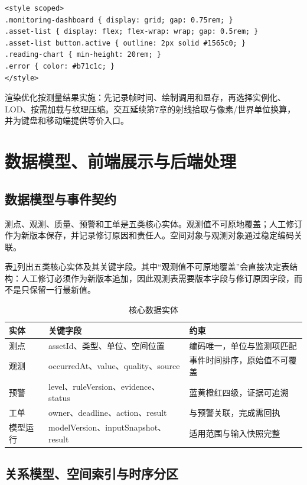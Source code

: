 \begin{lstlisting}[label={lst:ch08-monitoring-sfc},language=Vue,caption={测点筛选、ECharts 曲线与三维定位联动组件}]
<style scoped>
.monitoring-dashboard { display: grid; gap: 0.75rem; }
.asset-list { display: flex; flex-wrap: wrap; gap: 0.5rem; }
.asset-list button.active { outline: 2px solid #1565c0; }
.reading-chart { min-height: 20rem; }
.error { color: #b71c1c; }
</style>
\end{lstlisting}

渲染优化按测量结果实施：先记录帧时间、绘制调用和显存，再选择实例化、LOD、按需加载与纹理压缩。交互延续第7章的射线拾取与像素/世界单位换算，并为键盘和移动端提供等价入口。

\section{数据模型、前端展示与后端处理}

\subsection{数据模型与事件契约}

测点、观测、质量、预警和工单是五类核心实体。观测值不可原地覆盖；人工修订作为新版本保存，并记录修订原因和责任人。空间对象与观测对象通过稳定编码关联。

表\ref{tab:case-core-data}列出五类核心实体及其关键字段。其中“观测值不可原地覆盖”会直接决定表结构：人工修订必须作为新版本追加，因此观测表需要版本字段与修订原因字段，而不是只保留一行最新值。

\begin{table}[htbp]
\centering
\caption{核心数据实体}
\label{tab:case-core-data}
\begin{tabular}{p{2.4cm}p{4.5cm}p{5.5cm}}
\toprule
实体 & 关键字段 & 约束 \\
\midrule
测点 & assetId、类型、单位、空间位置 & 编码唯一，单位与监测项匹配 \\
观测 & occurredAt、value、quality、source & 事件时间排序，原始值不可覆盖 \\
预警 & level、ruleVersion、evidence、status & 蓝黄橙红四级，证据可追溯 \\
工单 & owner、deadline、action、result & 与预警关联，完成需回执 \\
模型运行 & modelVersion、inputSnapshot、result & 适用范围与输入快照完整 \\
\bottomrule
\end{tabular}
\end{table}

\subsection{关系模型、空间索引与时序分区}

